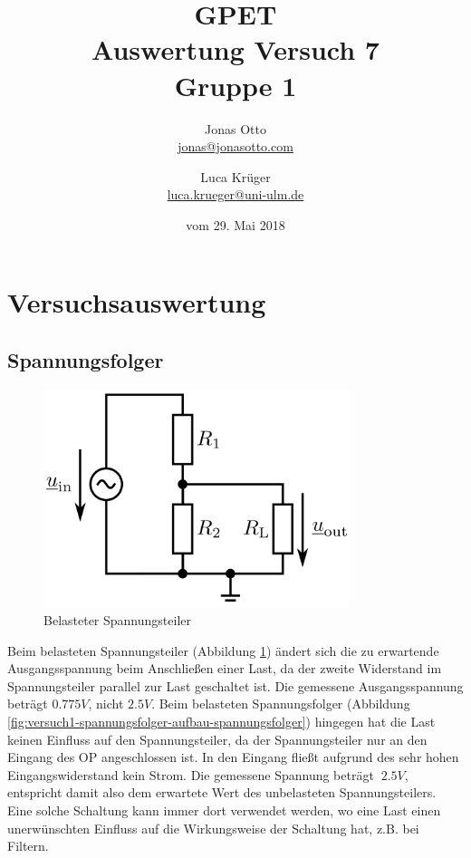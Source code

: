 \documentclass[a4paper]{article}
\title{GPET\\ Auswertung Versuch 7\\ Gruppe 1}
\author{Jonas Otto\\ \href{mailto:jonas@jonasotto.com}{jonas@jonasotto.com} 
   \and Luca Krüger \\ \href{mailto:luca.krueger@uni-ulm.de}{luca.krueger@uni-ulm.de} }
\date{vom   29. Mai 2018}
\begin{document}
    
\maketitle
\newpage
\section{Versuchsauswertung}

\subsection{Spannungsfolger}
\begin{figure}[H]
    \centering
    \includegraphics[width=0.8\textwidth]{versuch1/aufbau-spannungsteiler.png}
    \caption{Belasteter Spannungsteiler}
    \label{fig:versuch1-spannungsfolger-aufbau-spannungsteiler}
\end{figure}



Beim belasteten Spannungsteiler  (Abbildung \ref{fig:versuch1-spannungsfolger-aufbau-spannungsteiler}) ändert sich die zu erwartende Ausgangsspannung beim Anschließen einer Last, da der zweite Widerstand im Spannungsteiler parallel zur Last geschaltet ist. Die gemessene Ausgangsspannung beträgt $0.775\si{V}$, nicht $2.5\si{V}$. Beim belasteten Spannungsfolger (Abbildung \ref{fig:versuch1-spannungsfolger-aufbau-spannungsfolger}) hingegen hat die Last keinen Einfluss auf den Spannungsteiler, da der Spannungsteiler nur an den Eingang des OP angeschlossen ist. In den Eingang fließt aufgrund des sehr hohen Eingangswiderstand kein Strom. Die gemessene Spannung beträgt $~2.5\si{V}$, entspricht damit also dem erwartete Wert des unbelasteten Spannungsteilers. Eine solche Schaltung kann immer dort verwendet werden, wo eine Last einen unerwünschten Einfluss auf die Wirkungsweise der Schaltung hat, z.B. bei Filtern.
\end{document}
